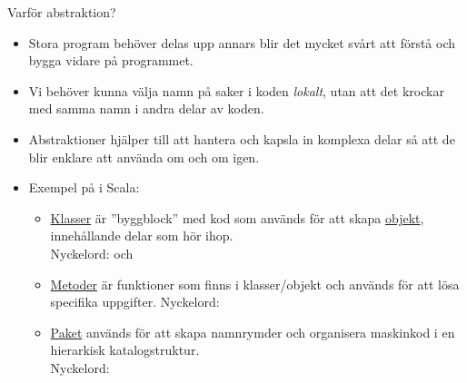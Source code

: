 \begin{Slide}{Varför abstraktion?}
\begin{itemize}
\item Stora program behöver delas upp annars blir det mycket svårt att förstå och bygga vidare på programmet.
\item Vi behöver kunna välja namn på saker i koden \textit{lokalt}, utan att det krockar med samma namn i andra delar av koden.
\item Abstraktioner hjälper till att hantera och kapsla in komplexa delar så att de blir enklare att använda om och om igen.

\item Exempel på  i Scala:
\begin{itemize}

\item \href{https://sv.wikipedia.org/wiki/Klass_\%28programmering\%29}{Klasser} är ''byggblock'' med kod som används för att skapa \href{https://sv.wikipedia.org/wiki/Objektorienterad_programmering\#Objekt}{objekt}, innehållande delar som hör ihop. \\ Nyckelord:  och 

\item \href{https://en.wikipedia.org/wiki/Method_\%28computer_programming\%29}{Metoder} är funktioner som finns i klasser/objekt och används för att lösa specifika uppgifter.  Nyckelord: 

\item \href{https://en.wikipedia.org/wiki/Java_package}{Paket} används för att skapa namnrymder och organisera maskinkod i en hierarkisk katalogstruktur. \\Nyckelord: 

\end{itemize}

\end{itemize}
\end{Slide}





